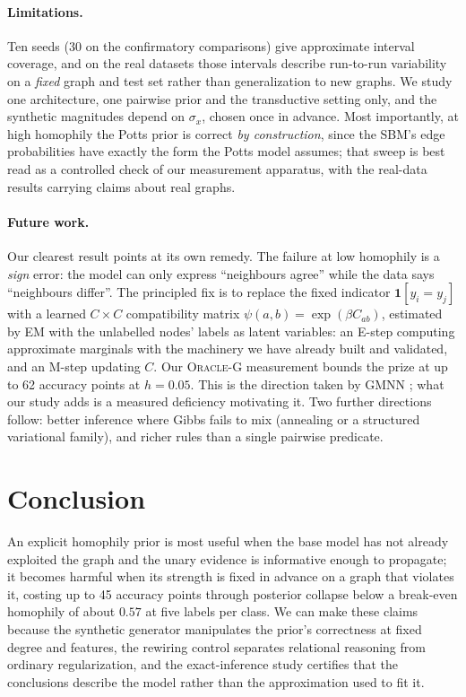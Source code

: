 \documentclass{article}
\begin{document}
\paragraph{Limitations.} Ten seeds (30 on the confirmatory comparisons) give approximate interval
coverage, and on the real datasets those intervals describe run-to-run variability on a
\emph{fixed} graph and test set rather than generalization to new graphs. We study one
architecture, one pairwise prior and the transductive setting only, and the synthetic magnitudes
depend on $\sigma_x$, chosen once in advance. Most importantly, at high homophily the Potts prior
is correct \emph{by construction}, since the SBM's edge probabilities have exactly the form the
Potts model assumes; that sweep is best read as a controlled check of our measurement apparatus,
with the real-data results carrying claims about real graphs.

\paragraph{Future work.}
\label{sec:future}
Our clearest result points at its own remedy. The failure at low homophily is a \emph{sign}
error: the model can only express ``neighbours agree'' while the data says ``neighbours differ''.
The principled fix is to replace the fixed indicator $\mathbf{1}[y_i=y_j]$ with a learned
$C\times C$ compatibility matrix $\psi(a,b)=\exp(\beta C_{ab})$, estimated by EM with the
unlabelled nodes' labels as latent variables: an E-step computing approximate marginals with the
machinery we have already built and validated, and an M-step updating $C$. Our \textsc{Oracle-G}
measurement bounds the prize at up to 62 accuracy points at $h=0.05$. This is the direction taken
by GMNN \citep{qu2019gmnn}; what our study adds is a measured deficiency motivating it. Two
further directions follow: better inference where Gibbs fails to mix (annealing or a structured
variational family), and richer rules than a single pairwise predicate.

\section{Conclusion}

An explicit homophily prior is most useful when the base model has not already exploited the
graph and the unary evidence is informative enough to propagate; it becomes harmful when its
strength is fixed in advance on a graph that violates it, costing up to 45 accuracy points through
posterior collapse below a break-even homophily of about $0.57$ at five labels per class. We can
make these claims because the synthetic generator manipulates the prior's correctness at fixed
degree and features, the rewiring control separates relational reasoning from ordinary
regularization, and the exact-inference study certifies that the conclusions describe the model
rather than the approximation used to fit it.
\end{document}
